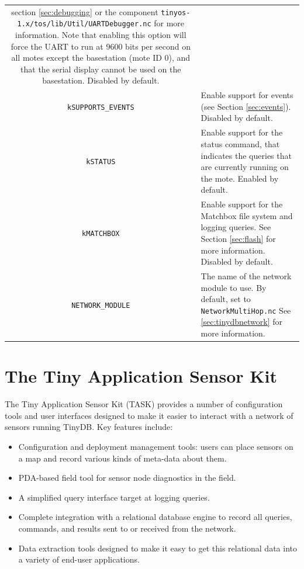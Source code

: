 \documentclass[11pt]{article}
\newcommand{\docroot}{tinyos-1.x}
\begin{document}
\begin{tabularx}{6in}{|c|X|}
section \ref{sec:debugging} or the component {\tt \docroot/tos/lib/Util/UARTDebugger.nc}
for more information.  Note that enabling this option will force the UART to run at 
9600 bits per second on all motes except the basestation (mote ID 0), and that the
serial display cannot be used on the basestation.  Disabled by default.\\ 
{\tt kSUPPORTS\_EVENTS}&  Enable support for events (see Section \ref{sec:events}).  Disabled
by default. \\
{\tt kSTATUS}&  Enable support for the status command, that indicates the queries that are
currently running on the mote.  Enabled by default. \\
{\tt kMATCHBOX}&  Enable support for the Matchbox file system and logging queries.  See Section
\ref{sec:flash} for more information.  Disabled by default. \\
{\tt NETWORK\_MODULE} &  The name of the network module to use.  By default, set to {\tt NetworkMultiHop.nc}
See \ref{sec:tinydbnetwork} for more information. \\
\hline
\end{tabularx}

\section{The Tiny Application Sensor Kit}\label{sec:task}

The Tiny Application Sensor Kit (TASK) provides a number of configuration tools and
user interfaces designed to make it easier to interact with a network of sensors running
TinyDB.  Key features include:

\begin{itemize}
\item Configuration and deployment management tools:  users can place sensors on a map and record various
kinds of meta-data about them.
\item PDA-based field tool for sensor node diagnostics in the field.
\item A simplified query interface target at logging queries.
\item Complete integration with a relational database engine to record all queries, commands, and
results sent to or received from the network.
\item Data extraction tools designed to make it easy to get this relational data into a variety of
end-user applications.
\end{itemize}
\end{document}
